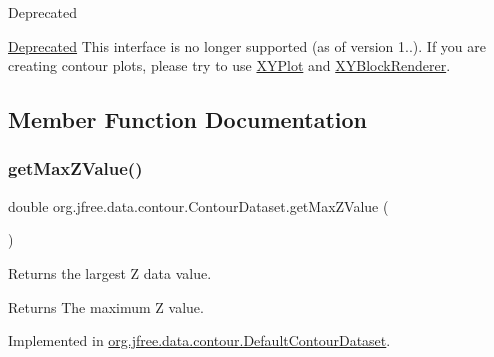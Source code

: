 \begin{DoxyRefDesc}{Deprecated}
\item[\mbox{\hyperlink{deprecated__deprecated000255}{Deprecated}}]This interface is no longer supported (as of version 1..). If you are creating contour plots, please try to use \mbox{\hyperlink{}{X\+Y\+Plot}} and \mbox{\hyperlink{}{X\+Y\+Block\+Renderer}}. \end{DoxyRefDesc}


\subsection{Member Function Documentation}
\mbox{\label{interfaceorg_1_1jfree_1_1data_1_1contour_1_1_contour_dataset_a660230892a67782a7a63c9357121344b}} 
\subsubsection{\texorpdfstring{get\+Max\+Z\+Value()}{getMaxZValue()}}
{\footnotesize\ttfamily double org.\+jfree.\+data.\+contour.\+Contour\+Dataset.\+get\+Max\+Z\+Value (\begin{DoxyParamCaption}{ }\end{DoxyParamCaption})}

Returns the largest Z data value.

\begin{DoxyReturn}{Returns}
The maximum Z value. 
\end{DoxyReturn}


Implemented in \mbox{\hyperlink{classorg_1_1jfree_1_1data_1_1contour_1_1_default_contour_dataset_a168e0cef5e2f7695f22b2af5f4808b57}{org.\+jfree.\+data.\+contour.\+Default\+Contour\+Dataset}}.

\mbox{\label{interfaceorg_1_1jfree_1_1data_1_1contour_1_1_contour_dataset_a27f848473fb6c0a89c91ea9101fe2698}} 
